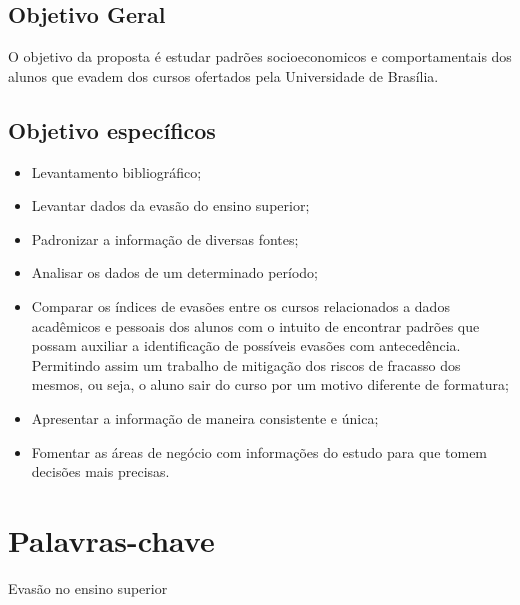 \subsection{Objetivo Geral}

O objetivo da proposta é estudar padrões socioeconomicos e comportamentais dos alunos que evadem dos cursos ofertados pela Universidade de Brasília. 
 
\subsection{Objetivo específicos}

\begin{enumerate} 
    \begin{itemize}
        \item   Levantamento bibliográfico;
        \item   Levantar dados da evasão do ensino superior;
        \item	Padronizar a informação de diversas fontes;
        \item	Analisar os dados de um determinado período;
        \item   Comparar os índices de evasões entre os cursos relacionados a dados acadêmicos e pessoais dos alunos com o intuito  de encontrar padrões que possam auxiliar a identificação de possíveis evasões com antecedência. Permitindo assim um trabalho de mitigação dos riscos de fracasso dos mesmos, ou seja, o aluno sair do curso por um motivo diferente de formatura;
        \item	Apresentar a informação de maneira consistente e única;
        \item	Fomentar as áreas de negócio com informações do estudo para que tomem decisões mais precisas.
        
    \end{itemize}%
\end{enumerate}%

\section{Palavras-chave}%
Evasão no ensino superior

